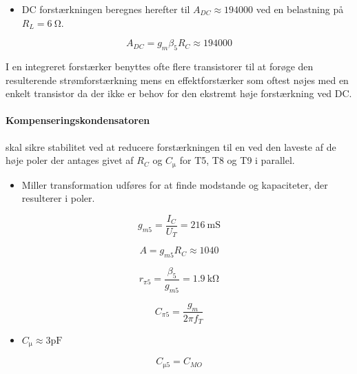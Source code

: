 \documentclass[danish]{article}
\begin{document}
\begin{itemize}
	\item DC forstærkningen beregnes herefter til $A_{DC} \approx 194000$ ved en belastning på $R_L = \SI{6}{\ohm}$.
\end{itemize}

\begin{equation}
A_{DC} = g_m \beta_5 R_C \approx 194000
\end{equation}

I en integreret forstærker benyttes ofte flere transistorer til at forøge den resulterende strømforstærkning mens en effektforstærker som oftest nøjes med en enkelt transistor da der ikke er behov for den ekstremt høje forstærkning ved DC. 

\paragraph{Kompenseringskondensatoren} skal sikre stabilitet ved at reducere forstærkningen til en ved den laveste af de høje poler der antages givet af $R_C$ og $C_{\si{\micro}}$ for T5, T8 og T9 i parallel.

\begin{itemize}
	\item Miller transformation udføres for at finde modstande og kapaciteter, der resulterer i poler.
\end{itemize}

\begin{equation} 
g_{m5} = \frac{I_C}{U_T} = \SI{216}{\milli\siemens}
\end{equation}

\begin{equation} 
A = g_{m5} R_C \approx 1040
\end{equation}

\begin{equation} 
r_{\pi 5} = \frac{\beta_5}{g_{m5}} = \SI{1.9}{\kilo\ohm}
\end{equation}

\begin{equation} 
C_{\si{\pi}5} = \frac{g_m}{2\pi f_T}
\end{equation}

\begin{itemize}
	\item $C_{\si{\micro}} \approx 3 \si{\pico\farad}$
\end{itemize}

\begin{equation} 
C_{\si{\micro}5} = C_{MO}
\end{equation}
\end{document}
